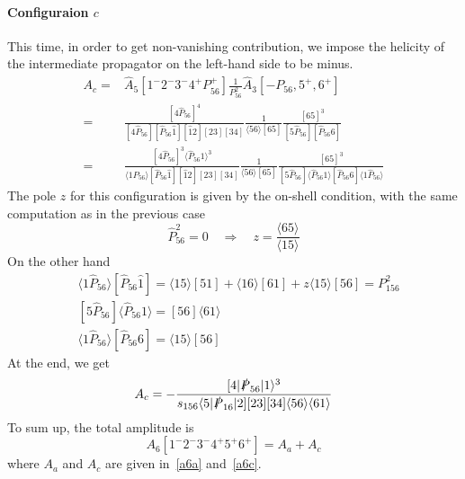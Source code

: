 \paragraph{Configuraion $c$}
This time, in order to get non-vanishing contribution, we impose the helicity of the intermediate propagator on the left-hand side to be minus.
\begin{equation*}
\begin{split}
A_c = & \hat{A}_5[1^-2^-3^-4^+ P_{56}^+]\frac{1}{P_{56}^2}\hat{A}_3[-P_{56},5^+,6^+]
\\
= &
\frac{[4\hat{P}_{56}]^4}{[4\hat{P}_{56}][\hat{P}_{56}\hat{1}][\hat{1}2][23][34]}\frac{1}{\langle 56\rangle [65]}\frac{[65]^3}{[5\hat{P}_{56}][\hat{P}_{56}6]}
\\
= &
\frac{[4\hat{P}_{56}]^3\langle\hat{P}_{56}1\rangle^3}{\langle 1P_{56}\rangle [\hat{P}_{56}\hat{1}][\hat{1}2][23][34]}\frac{1}{\langle 56\rangle [65]}\frac{[65]^3}{[5\hat{P}_{56}]\langle \hat{P}_{56} 1\rangle [\hat{P}_{56} 6]\langle 1\hat{P}_{56}\rangle}
\end{split}
\end{equation*}
The pole $z$ for this configuration is given by the on-shell condition, with the same computation as in the previous case
\begin{equation*}
\hat{P}_{56}^2 = 0 \quad\Rightarrow\quad
z=\frac{\langle 65\rangle}{\langle 15\rangle}
\end{equation*}
On the other hand
\begin{equation*}
\begin{split}
& \langle 1\hat{P}_{56}\rangle [\hat{P}_{56}\hat{1}] = \langle 15 \rangle[51] + \langle 16\rangle[61] + z\langle 15 \rangle[56] = P_{156}^2
\\
& [5\hat{P}_{56}]\langle\hat{P}_{56} 1 \rangle = [56]\langle 61\rangle
\\
&
\langle 1 \hat{P}_{56}\rangle[\hat{P}_{56}6] =\langle 15\rangle[56]
\end{split}
\end{equation*}
At the end, we get
\begin{equation}\label{a6c}
A_c = -\frac{[4|\slashed{P}_{56}|1\rangle^3}{s_{156}\langle 5|\slashed{P}_{16}|2][23][34]\langle 56\rangle\langle 61\rangle}
\end{equation}
To sum up, the total amplitude is
\begin{equation*}
A_6[1^-2^-3^-4^+5^+6^+] = A_a + A_c
\end{equation*}
where $A_a$ and $A_c$ are given in~\cref{a6a} and~\cref{a6c}.
